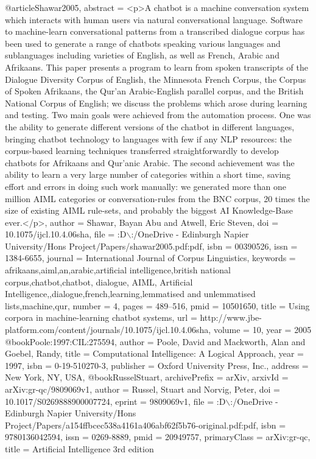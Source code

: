 @article{Shawar2005,
      abstract = {{\textless}p{\textgreater}A chatbot is a machine conversation system which interacts with human users via natural conversational language. Software to machine-learn conversational patterns from a transcribed dialogue corpus has been used to generate a range of chatbots speaking various languages and sublanguages including varieties of English, as well as French, Arabic and Afrikaans. This paper presents a program to learn from spoken transcripts of the Dialogue Diversity Corpus of English, the Minnesota French Corpus, the Corpus of Spoken Afrikaans, the Qur'an Arabic-English parallel corpus, and the British National Corpus of English; we discuss the problems which arose during learning and testing. Two main goals were achieved from the automation process. One was the ability to generate different versions of the chatbot in different languages, bringing chatbot technology to languages with few if any NLP resources: the corpus-based learning techniques transferred straightforwardly to develop chatbots for Afrikaans and Qur'anic Arabic. The second achievement was the ability to learn a very large number of categories within a short time, saving effort and errors in doing such work manually: we generated more than one million AIML categories or conversation-rules from the BNC corpus, 20 times the size of existing AIML rule-sets, and probably the biggest AI Knowledge-Base ever.{\textless}/p{\textgreater}},
      author = {Shawar, Bayan Abu and Atwell, Eric Steven},
      doi = {10.1075/ijcl.10.4.06sha},
      file = {:D$\backslash$:/OneDrive - Edinburgh Napier University/Hons Project/Papers/shawar2005.pdf:pdf},
      isbn = {00390526},
      issn = {1384-6655},
      journal = {International Journal of Corpus Linguistics},
      keywords = {afrikaans,aiml,an,arabic,artificial intelligence,british national corpus,chatbot,chatbot, dialogue, AIML, Artificial Intelligence,,dialogue,french,learning,lemmatised and unlemmatised lists,machine,qur},
      number = {4},
      pages = {489--516},
      pmid = {10501650},
      title = {{Using corpora in machine-learning chatbot systems}},
      url = {http://www.jbe-platform.com/content/journals/10.1075/ijcl.10.4.06sha},
      volume = {10},
      year = {2005}
}
@book{Poole:1997:CIL:275594,
      author = {Poole, David and Mackworth, Alan and Goebel, Randy},
      title = {Computational Intelligence: A Logical Approach},
      year = {1997},
      isbn = {0-19-510270-3},
      publisher = {Oxford University Press, Inc.},
      address = {New York, NY, USA},
} 
@book{RusselStuart,
      archivePrefix = {arXiv},
      arxivId = {arXiv:gr-qc/9809069v1},
      author = {{Russel, Stuart} and {Norvig, Peter}},
      doi = {10.1017/S0269888900007724},
      eprint = {9809069v1},
      file = {:D$\backslash$:/OneDrive - Edinburgh Napier University/Hons Project/Papers/a154ffbcec538a4161a406abf62f5b76-original.pdf:pdf},
      isbn = {9780136042594},
      issn = {0269-8889},
      pmid = {20949757},
      primaryClass = {arXiv:gr-qc},
      title = {{Artificial Intelligence 3rd edition}}
}



